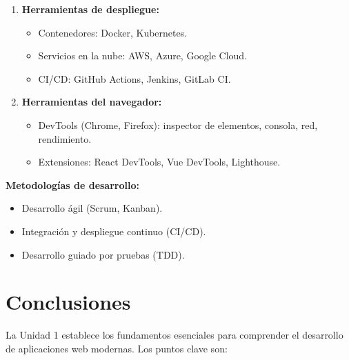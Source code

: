 \documentclass[12pt,letterpaper]{article}
\begin{document}
\begin{enumerate}
    \item \textbf{Herramientas de despliegue:}
    \begin{itemize}
        \item Contenedores: Docker, Kubernetes.
        \item Servicios en la nube: AWS, Azure, Google Cloud.
        \item CI/CD: GitHub Actions, Jenkins, GitLab CI.
    \end{itemize}
    
    \item \textbf{Herramientas del navegador:}
    \begin{itemize}
        \item DevTools (Chrome, Firefox): inspector de elementos, consola, red, rendimiento.
        \item Extensiones: React DevTools, Vue DevTools, Lighthouse.
    \end{itemize}
\end{enumerate}

\textbf{Metodolog\'ias de desarrollo:}
\begin{itemize}
    \item Desarrollo \'agil (Scrum, Kanban).
    \item Integraci\'on y despliegue continuo (CI/CD).
    \item Desarrollo guiado por pruebas (TDD).
\end{itemize}

\newpage
\section{Conclusiones}

La Unidad 1 establece los fundamentos esenciales para comprender el desarrollo de aplicaciones web modernas. Los puntos clave son:
\end{document}
